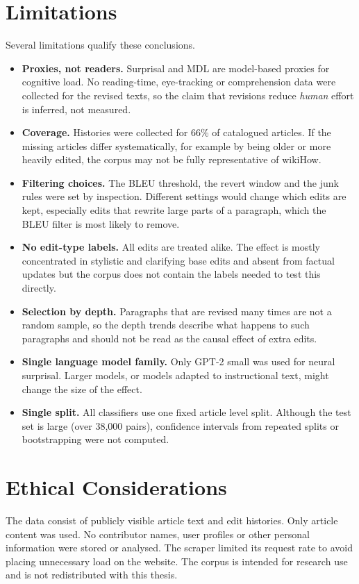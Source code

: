 \documentclass[12pt,a4paper,oneside]{report}
\begin{document}
\section{Limitations}
Several limitations qualify these conclusions.
\begin{itemize}
  \item \textbf{Proxies, not readers.} Surprisal and MDL are model-based proxies for cognitive load. No reading-time, eye-tracking or comprehension data were collected for the revised texts, so the claim that revisions reduce \emph{human} effort is inferred, not measured.
  \item \textbf{Coverage.} Histories were collected for 66\% of catalogued articles. If the missing articles differ systematically, for example by being older or more heavily edited, the corpus may not be fully representative of wikiHow.
  \item \textbf{Filtering choices.} The BLEU threshold, the revert window and the junk rules were set by inspection. Different settings would change which edits are kept, especially edits that rewrite large parts of a paragraph, which the BLEU filter is most likely to remove.
  \item \textbf{No edit-type labels.} All edits are treated alike. The effect is mostly concentrated in stylistic and clarifying base edits and absent from factual updates but the corpus does not contain the labels needed to test this directly.
  \item \textbf{Selection by depth.} Paragraphs that are revised many times are not a random sample, so the depth trends describe what happens to such paragraphs and should not be read as the causal effect of extra edits.
  \item \textbf{Single language model family.} Only GPT-2 small was used for neural surprisal. Larger models, or models adapted to instructional text, might change the size of the effect.
\item \textbf{Single split.} All classifiers use one fixed article level split. Although the test set is large (over 38{,}000 pairs), confidence intervals from repeated splits or bootstrapping were not computed.
\end{itemize}

\section{Ethical Considerations}
The data consist of publicly visible article text and edit histories. Only article content was used. No contributor names, user profiles or other personal information were stored or analysed. The scraper limited its request rate to avoid placing unnecessary load on the website. The corpus is intended for research use and is not redistributed with this thesis.
\end{document}

